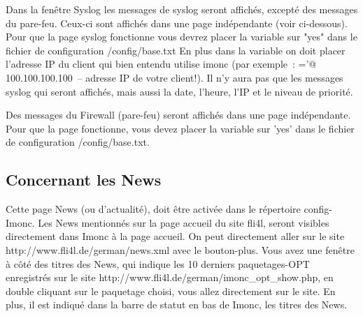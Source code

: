   Dans la fenêtre Syslog les messages de syslog seront affichés, excepté des
  messages du pare-feu. Ceux-ci sont affichés dans une page indépendante
  (voir ci-dessous). Pour que la page syslog  fonctionne vous devrez placer
  la variable  sur "yes" dans le fichier de configuration
  /config/base.txt En plus dans la variable  on doit
  placer l'adresse IP du client qui bien entendu utilise imonc (par exemple~:
  ='@ 100.100.100.100~-- adresse IP de votre client!).
  Il n'y aura pas que les messages syslog qui seront affichés, mais aussi
  la date, l'heure, l'IP et le niveau de priorité.

  Des messages du Firewall (pare-feu) seront affichés dans une page
  indépendante. Pour que la page fonctionne, vous devez placer la variable
   sur 'yes' dans le fichier de configuration /config/base.txt.

  \subsection{Concernant les News}

  Cette page News (ou d'actualité), doit être activée dans le répertoire
  config-Imonc. Les News mentionnés sur la page accueil du site fli4l, seront
  visibles directement dans Imonc à la page accueil. On peut directement aller
  sur le site http://www.fli4l.de/german/news.xml avec le bouton-plus. Vous
  avez une fenêtre à côté des titres des News, qui indique les 10 derniers
  paquetages-OPT enregistrés sur le site
  http://www.fli4l.de/german/imonc\_opt\_show.php, en double cliquant sur le
  paquetage choisi, vous allez directement sur le site. En plus, il est
  indiqué dans la barre de statut en bas de Imonc, les titres des News.
